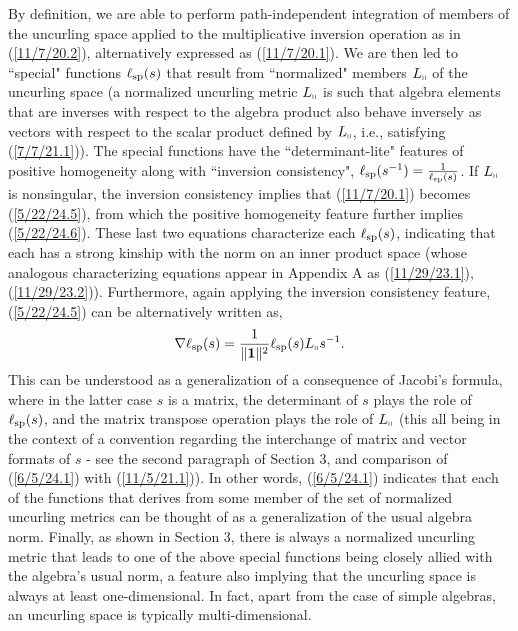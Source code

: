 \documentclass{amsart}
\numberwithin{equation}{section}
\theoremstyle{definition}
\numberwithin{theorem}{section}
\begin{document}
 By definition, we are able to perform path-independent integration of members of the uncurling space applied to the multiplicative inversion operation as in (\ref{11/7/20.2}), alternatively expressed as (\ref{11/7/20.1}).  
We are then led to ``special" functions $\ell_{\rm sp}(s)$ that result from ``normalized" members $L_{\shortparallel}$ of the uncurling space (a normalized uncurling metric $L_{\shortparallel}$ is such that algebra elements that are inverses with respect to the algebra product also behave inversely as vectors with respect to the scalar product defined by $L_{\shortparallel}$, i.e., satisfying (\ref{7/7/21.1})).  The special functions have the \mbox{``determinant-lite"} features of positive homogeneity along with ``inversion consistency", $\ell_{\rm sp}(s^{-1}) = \frac{1}{\ell_{\rm sp}(s)}$.  If $L_{\shortparallel}$ is nonsingular, the inversion consistency implies that (\ref{11/7/20.1}) becomes (\ref{5/22/24.5}), from which the positive homogeneity feature further implies (\ref{5/22/24.6}).  These last two equations characterize each $\ell_{\rm sp}(s)$, indicating that each has a strong kinship with the norm on an inner product space (whose analogous characterizing equations appear in Appendix A as (\ref{11/29/23.1}),  (\ref{11/29/23.2})). Furthermore, again applying the inversion consistency feature, (\ref{5/22/24.5}) can be alternatively written as,  \begin{equation}\label{6/5/24.1} \nabla\ell_{\rm sp}(s) = \frac{1}{\|\mathbf{1}\|^{2}}\ell_{\rm sp}(s) L_{\shortparallel}s^{-1}.\end{equation} This can be understood as a generalization of a consequence of Jacobi's formula, where in the latter case $s$ is a matrix, the determinant of $s$ plays the role of $\ell_{\rm sp}(s)$, and the matrix transpose operation plays the role of $L_{\shortparallel}$ (this all being in the context of a convention regarding the interchange of matrix and vector formats of $s$  -  see the second paragraph of Section 3, and comparison of (\ref{6/5/24.1}) with (\ref{11/5/21.1})).  In other words, (\ref{6/5/24.1}) indicates that each of the functions that derives from some member of the set of normalized uncurling metrics can be thought of as a generalization of the usual algebra norm.  Finally, as shown in Section 3, there is always a normalized uncurling metric that leads to one of the above special functions being closely allied with the algebra's usual norm, a feature also implying that the uncurling space is always at least one-dimensional.  In fact, apart from the case of simple algebras, an uncurling space is typically multi-dimensional.  
\end{document}

